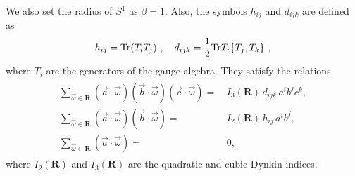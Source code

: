 \documentclass[letterpaper, 11pt]{article}
\def\half{\frac{1}{2}}
\def\Tr{{\rm Tr}}
\begin{document}
We also set the radius of ${S}^1$ as $\beta = 1$. Also, the symbols $h_{ij}$ and $d_{ijk}$ are defined as 
\begin{align}
 h_{ij} = \Tr (T_i T_j ) \ , \quad
 d_{ijk} = \half \Tr T_i \{T_j,  T_k\} \ , 
\end{align}
where $T_i$ are the generators of the gauge algebra. 
They satisfy the relations
\begin{align}
\begin{split}
   \sum_{\vec{\omega}\in\mathbf{R}}(\vec{a}\cdot\vec{\omega})(\vec{b}\cdot\vec{\omega})(\vec{c}\cdot\vec{\omega})=&\,I_3(\mathbf{R})\,d_{ijk}\,a^ib^jc^k, \\
   \sum_{\vec{\omega}\in\mathbf{R}}(\vec{a}\cdot\vec{\omega})(\vec{b}\cdot\vec{\omega})=&\,I_2(\mathbf{R})\,h_{ij}\,a^ib^j,\\
   \sum_{\vec{\omega}\in\mathbf{R}}(\vec{a}\cdot\vec{\omega})=&\,0 , 
\end{split}
\end{align}
where $I_2(\mathbf{R})$ and $I_3(\mathbf{R})$ are the quadratic and cubic Dynkin indices. 
\end{document}
